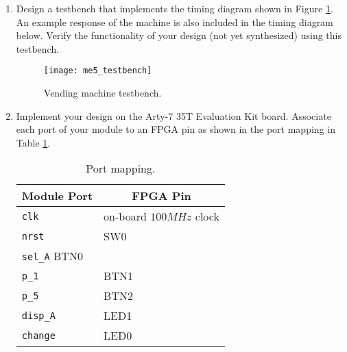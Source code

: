 \begin{enumerate}
\begin{enumerate}
					\item The machine dispenses change in PHP 1 increments. This is represented by the output \texttt{change}. The machine starts to dispense change in the same clock cycle that the item is dispensed. A single clock cycle where the output \texttt{change} is set to 1 represents a dispensed PHP 1 coin. This step is repeated until all change has been dispensed. It is only during this step that the output \texttt{change} can be set to 1. Otherwise, it is set to 0 by default. All inputs (\texttt{sel\_A} \texttt{p\_1}, \texttt{p\_5}) are ignored during this step. After dispensing all of the change, the machine then proceeds back to the starting state.
					
				\end{enumerate}
			
			\item Design a testbench that implements the timing diagram shown in Figure \ref{fig:testbench}. An example response of the machine is also included in the timing diagram below. Verify the functionality of your design (not yet synthesized) using this testbench. 
				\begin{figure}[!htbp]
					\centering
					\texttt{[image: me5\_testbench]}
					\caption{Vending machine testbench.}
					\label{fig:testbench}
				\end{figure}
			
			
			\item Implement your design on the Arty-7 35T Evaluation Kit board. Associate each port of your module to an FPGA pin as shown in the port mapping in Table \ref{tab:port}.
			
				\begin{table}[!htbp]
					\centering
					\caption{Port mapping.}
					\label{tab:port}
					\begin{tabular}{ | l | l | }
						\hline
						\multicolumn{1}{|c|}{Module Port} & \multicolumn{1}{c|}{FPGA Pin} \\
						\hline\hline
						\texttt{clk} & on-board $100MHz$ clock \\
						\hline
						\texttt{nrst} & SW0 \\
						\hline
						\texttt{sel\_A} BTN0 \\
						\hline
						\texttt{p\_1} & BTN1 \\
						\hline
						\texttt{p\_5} & BTN2 \\
						\hline
						\texttt{disp\_A} & LED1 \\
						\hline
						\texttt{change} & LED0 \\
						\hline
					\end{tabular}
				\end{table}
		\end{enumerate}